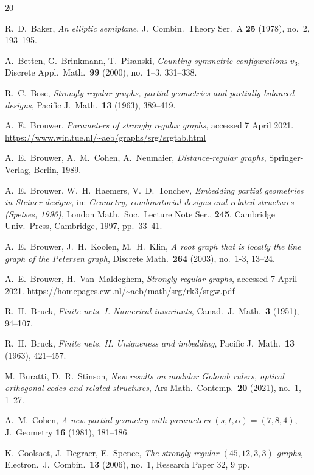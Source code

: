 \documentclass[12pt, reqno]{amsart}
\begin{document}
\begin{thebibliography}{20}

R.~D.~Baker, \emph{An elliptic semiplane}, J.\ Combin.\ Theory Ser.\
A \textbf{25} (1978), no.\ 2, 193--195.

A.~Betten, G.~Brinkmann, T.~Pisanski, \emph{Counting symmetric
configurations $v_3$}, Discrete Appl.\ Math.\ \textbf{99} (2000),
no.\ 1--3, 331--338.

R.~C.~Bose, \emph{Strongly regular graphs, partial geometries and
partially balanced designs}, Pacific J.\ Math.\ \textbf{13} (1963),
389--419.

A.~E.~Brouwer, \emph{Parameters of strongly regular graphs},
accessed 7 April 2021.
\url{https://www.win.tue.nl/~aeb/graphs/srg/srgtab.html}

A.~E.~Brouwer, A.~M.~Cohen, A.~Neumaier, \emph{Distance-regular
graphs}, Springer-Verlag, Berlin, 1989.

A.~E.~Brouwer, W.~H.~Haemers, V.~D.~Tonchev, \emph{Embedding partial
geometries in Steiner designs}, in: \emph{Geometry, combinatorial designs
and related structures (Spetses, 1996)}, London Math.\ Soc.\ Lecture Note Ser.,
\textbf{245}, Cambridge Univ.\ Press, Cambridge, 1997, pp.~33--41.

A.~E.~Brouwer, J.~H.~Koolen, M.~H.~Klin, \emph{A root graph that is
locally the line graph of the Petersen graph}, Discrete Math.\
\textbf{264} (2003), no.\ 1-3, 13--24.

A.~E.~Brouwer, H.~Van~Maldeghem, \emph{Strongly regular graphs}, accessed 7 April 2021.
\url{https://homepages.cwi.nl/~aeb/math/srg/rk3/srgw.pdf}

R.~H.~Bruck, \emph{Finite nets. I. Numerical invariants},
Canad.\ J.\ Math.\ \textbf{3} (1951), 94--107.

R.~H.~Bruck, \emph{Finite nets. II. Uniqueness and imbedding},
Pacific J.\ Math.\ \textbf{13} (1963), 421--457.

M.~Buratti, D.~R.~Stinson, \emph{New results on modular Golomb
rulers, optical orthogonal codes and related structures},
Ars Math.\ Contemp.\ \textbf{20} (2021), no.\ 1, 1--27.

A.~M.~Cohen, \emph{A new partial geometry with parameters
$(s,t,\alpha) = (7,8,4)$}, J.\ Geometry \textbf{16} (1981),
181--186.

K.~Coolsaet, J.~Degraer, E.~Spence, \emph{The strongly regular
$(45,12,3,3)$ graphs}, Electron.\ J.\ Combin.\ \textbf{13} (2006),
no.\ 1, Research Paper 32, 9 pp.


\end{thebibliography}
\end{document}
